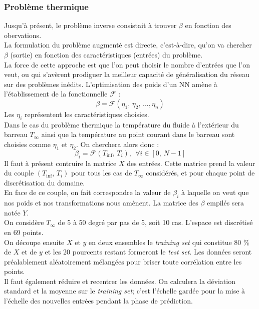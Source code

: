 \documentclass[a4paper,12pt]{article}
\newcommand{\bepar}[1]{
	\left( #1 \right)  
}
\newcommand{\becro}[1]{
	\left[ #1 \right]  
}
\newcommand{\tinf}{$T_\infty$}
\newcommand\bk{\color{black}}
\newcommand\dsb{\color{dsb}}
\newcommand{\cad}{c'est-à-dire}
\numberwithin{equation}{section} %
\begin{document}
\dsb \subsubsection{Problème thermique} \bk
\noindent Jusqu'à présent, le problème inverse consistait à trouver $\beta$ en fonction des obervations. \\
La formulation du problème augmenté est directe, \cad  $ $, qu'on va chercher $\beta$ (sortie) en fonction des caractéristiques (entrées) du problème.\\
La force de cette approche est que l'on peut choisir le nombre d'entrées que l'on veut, ou qui s'avèrent prodiguer la meilleur capacité de généralisation du réseau sur des problèmes inédits. L'optimisation des poids d'un NN amène à l'établissement de la fonctionnelle $\mathcal{F}$ : 
\begin{equation}
\beta = \mathcal{F}\bepar{\eta_1,\,\eta_2,\, ...,\eta_n}
\end{equation}
Les $\eta_i$ représentent les caractéristiques choisies.\\
Dans le cas du problème thermique la température du fluide à l'extérieur du barreau \tinf $ $ ainsi que la température au point courant dans le barreau sont choisies comme $\eta_1$ et $\eta_2$. On cherchera alors donc : 
\begin{equation}
\beta_i = \mathcal{F}\bepar{T_{\text{inf}}, \, T_i}, \ \ \forall i \in \becro{0,\, N-1} 
\end{equation}
Il faut à présent contruire la matrice $X$ des entrées. Cette matrice prend la valeur du couple $\bepar{T_{\text{inf}}, \, T_i}$ pour tous les cas de \tinf $ $ considérés, et pour chaque point de discrétisation du domaine.\\
En face de ce couple, on fait correspondre la valeur de $\beta_i$ à laquelle on veut que nos poids et nos transformations nous amènent. La matrice des $\beta$ empilés sera notée $Y$.\\

\noindent On considère \tinf $ $ de 5 à 50 degré par pas de 5, soit 10 cas. L'espace est discrétisé en 69 points.\\
On découpe ensuite $X$ et $y$ en deux ensembles le \textit{training set} qui constitue 80 \% de $X$ et de $y$ et les 20 pourcents restant formeront le \textit{test set}. Les données seront préalablement aléatoirement mélangées pour briser toute corrélation entre les points.\\
Il faut également réduire et recentrer les données. On calculera la déviation standard et la moyenne sur le \textit{training set}; c'est l'échelle gardée pour la mise à l'échelle des nouvelles entrées pendant la phase de prédiction.\\
\end{document}
